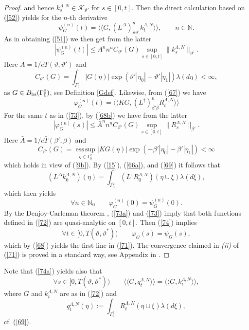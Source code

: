 \documentclass[reqno,11pt]{amsart}
\theoremstyle{definition}
\theoremstyle{remark}
\numberwithin{equation}{section}
\begin{document}
\begin{proof}
and hence $k_{s}^{\Lambda,N} \in \mathcal{K}_{\vartheta'}$ for $s\in
[0,t]$. Then the  direct calculation based on (\ref{52}) yields for
the $n$-th derivative
\[
\psi_G^{(n)} (t) = \langle \! \langle G, (L^\Delta)^n_{\vartheta
\vartheta'} k^{\Lambda,N}_t \rangle \!\rangle, \qquad n \in
\mathds{N}.
\]
As in obtaining (\ref{51}) we then get from the latter
\begin{equation}
  \label{73}
|\psi_G^{(n)} (t) | \leq A^n n^n C_{\vartheta'}(G) \sup_{s\in
[0,t]}\|k^{\Lambda,N}_s\|_{\vartheta'}.
\end{equation}
Here $A= 1/ e T(\vartheta, \vartheta')$ and
\[
C_{\vartheta'}(G)  = \int_{\Gamma_0^2} |G(\eta)|\exp\left( \vartheta
' |\eta_0| + \vartheta '|\eta_1| \right) \lambda(d\eta) <\infty,
\]
as $G\in B_{\rm bs}(\Gamma_0^2)$, see Definition \ref{Gdef}.
Likewise, from  (\ref{67}) we have
\[
\varphi^{(n)}_G (t) = \langle \! \langle KG,
(L^\dagger)^n_{\beta'\beta} R^{\Lambda,N}_t \rangle \! \rangle
\]
For the same $t$ as in (\ref{73}), by (\ref{68b}) we have from the
latter
\begin{equation}
  \label{73a}
|\varphi_G^{(n)} (s) | \leq \bar{A}^n n^n C_{\beta'}(G) \sup_{s\in
[0,t]}\|R^{\Lambda,N}_s\|_{\beta'}.
\end{equation}
Here $\bar{A}= 1/ e \bar{T}(\beta', \beta)$ and
\[
C_{\beta'}(G)  =  \operatorname*{\mathrm{ess\,sup}}_{\eta \in \Gamma_0^2} |KG(\eta)| \exp
\left(-\beta' |\eta_0| - \beta'|\eta_1|\right) <\infty
\]
which holds in view of (\ref{9b}). By (\ref{15}), (\ref{66a}), and
(\ref{69}) it follows that
\[
(L^\Delta k^{\Lambda,N}_0)(\eta)=\int_{\Gamma^2_0}(L^\dagger
R_0^{\Lambda,N})(\eta \cup \xi) \lambda (d\xi),
\]
which then yields
\begin{equation}
  \label{74}
\forall n\in \mathds{N}_0 \qquad \varphi^{(n)}_G(0) =
\psi^{(n)}_G(0).
\end{equation}
By the Denjoy-Carleman theorem \cite{DC}, (\ref{73a}) and (\ref{73})
imply that both functions defined in (\ref{72}) are quasi-analytic
on $[0,t]$. Then (\ref{74}) implies
\begin{equation}
  \label{74a}
 \forall t\in [0,T(\vartheta, \vartheta^*)) \qquad \varphi_G(s) = \psi_G(s),
\end{equation}
which by (\ref{68}) yields the first  line in (\ref{71}). The
convergence claimed in {\it(ii)} of (\ref{71}) is proved in a
standard way, see Appendix in \cite{BKKK}.
\end{proof}
Note that (\ref{74a}) yields also that
\begin{equation}
  \label{74b}
 \forall s\in [0,T(\vartheta, \vartheta^*)) \qquad \langle
 \!\langle G,  q^{\Lambda,N}_t\rangle \!\rangle
= \langle
 \!\langle G,  k^{\Lambda,N}_t\rangle \!\rangle,
\end{equation}
where $G$ and  $k^{\Lambda,N}_t$ are as in (\ref{72}) and
\begin{equation}
  \label{74c}
q^{\Lambda,N}_t (\eta) := \int_{\Gamma_0^2} R^{\Lambda,N}_t (\eta
\cup \xi) \lambda (d\xi),
\end{equation}
cf. (\ref{69}).
\end{document}
